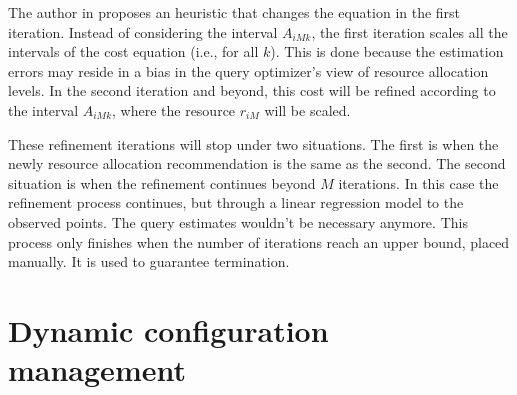 The author in \cite{Soror:2008:AVM:1376616.1376711} proposes an heuristic that changes the equation in the first iteration. Instead of  considering the interval $A_{iMk}$, the first iteration scales all the intervals of the cost equation (i.e., for all $k$). This is done because the estimation errors may reside in a bias in the query optimizer's view of resource allocation levels. In the second iteration and beyond, this cost will be refined according to the interval $A_{iMk}$, where the resource $r_{iM}$ will be scaled.

These refinement iterations will stop under two situations. The first is when the newly resource allocation recommendation is the same as the second. The second situation is when the refinement continues beyond $M$ iterations. In this case the refinement process continues, but through a linear regression model to the observed points. The query estimates wouldn't be necessary anymore. This process only finishes when the number of iterations reach an upper bound, placed manually. It is used to guarantee termination.

\section{Dynamic configuration management}
